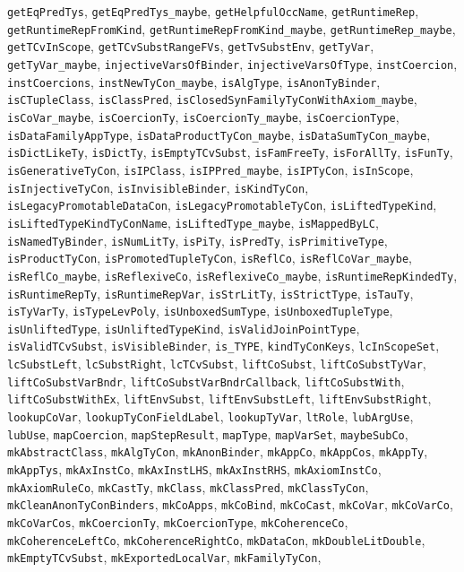 \texttt{getEqPredTys}, \texttt{getEqPredTys_maybe}, \texttt{getHelpfulOccName}, \texttt{getRuntimeRep}, \texttt{getRuntimeRepFromKind}, \texttt{getRuntimeRepFromKind_maybe}, \texttt{getRuntimeRep_maybe}, \texttt{getTCvInScope}, \texttt{getTCvSubstRangeFVs}, \texttt{getTvSubstEnv}, \texttt{getTyVar}, \texttt{getTyVar_maybe}, \texttt{injectiveVarsOfBinder}, \texttt{injectiveVarsOfType}, \texttt{instCoercion}, \texttt{instCoercions}, \texttt{instNewTyCon_maybe}, \texttt{isAlgType}, \texttt{isAnonTyBinder}, \texttt{isCTupleClass}, \texttt{isClassPred}, \texttt{isClosedSynFamilyTyConWithAxiom_maybe}, \texttt{isCoVar_maybe}, \texttt{isCoercionTy}, \texttt{isCoercionTy_maybe}, \texttt{isCoercionType}, \texttt{isDataFamilyAppType}, \texttt{isDataProductTyCon_maybe}, \texttt{isDataSumTyCon_maybe}, \texttt{isDictLikeTy}, \texttt{isDictTy}, \texttt{isEmptyTCvSubst}, \texttt{isFamFreeTy}, \texttt{isForAllTy}, \texttt{isFunTy}, \texttt{isGenerativeTyCon}, \texttt{isIPClass}, \texttt{isIPPred_maybe}, \texttt{isIPTyCon}, \texttt{isInScope}, \texttt{isInjectiveTyCon}, \texttt{isInvisibleBinder}, \texttt{isKindTyCon}, \texttt{isLegacyPromotableDataCon}, \texttt{isLegacyPromotableTyCon}, \texttt{isLiftedTypeKind}, \texttt{isLiftedTypeKindTyConName}, \texttt{isLiftedType_maybe}, \texttt{isMappedByLC}, \texttt{isNamedTyBinder}, \texttt{isNumLitTy}, \texttt{isPiTy}, \texttt{isPredTy}, \texttt{isPrimitiveType}, \texttt{isProductTyCon}, \texttt{isPromotedTupleTyCon}, \texttt{isReflCo}, \texttt{isReflCoVar_maybe}, \texttt{isReflCo_maybe}, \texttt{isReflexiveCo}, \texttt{isReflexiveCo_maybe}, \texttt{isRuntimeRepKindedTy}, \texttt{isRuntimeRepTy}, \texttt{isRuntimeRepVar}, \texttt{isStrLitTy}, \texttt{isStrictType}, \texttt{isTauTy}, \texttt{isTyVarTy}, \texttt{isTypeLevPoly}, \texttt{isUnboxedSumType}, \texttt{isUnboxedTupleType}, \texttt{isUnliftedType}, \texttt{isUnliftedTypeKind}, \texttt{isValidJoinPointType}, \texttt{isValidTCvSubst}, \texttt{isVisibleBinder}, \texttt{is_TYPE}, \texttt{kindTyConKeys}, \texttt{lcInScopeSet}, \texttt{lcSubstLeft}, \texttt{lcSubstRight}, \texttt{lcTCvSubst}, \texttt{liftCoSubst}, \texttt{liftCoSubstTyVar}, \texttt{liftCoSubstVarBndr}, \texttt{liftCoSubstVarBndrCallback}, \texttt{liftCoSubstWith}, \texttt{liftCoSubstWithEx}, \texttt{liftEnvSubst}, \texttt{liftEnvSubstLeft}, \texttt{liftEnvSubstRight}, \texttt{lookupCoVar}, \texttt{lookupTyConFieldLabel}, \texttt{lookupTyVar}, \texttt{ltRole}, \texttt{lubArgUse}, \texttt{lubUse}, \texttt{mapCoercion}, \texttt{mapStepResult}, \texttt{mapType}, \texttt{mapVarSet}, \texttt{maybeSubCo}, \texttt{mkAbstractClass}, \texttt{mkAlgTyCon}, \texttt{mkAnonBinder}, \texttt{mkAppCo}, \texttt{mkAppCos}, \texttt{mkAppTy}, \texttt{mkAppTys}, \texttt{mkAxInstCo}, \texttt{mkAxInstLHS}, \texttt{mkAxInstRHS}, \texttt{mkAxiomInstCo}, \texttt{mkAxiomRuleCo}, \texttt{mkCastTy}, \texttt{mkClass}, \texttt{mkClassPred}, \texttt{mkClassTyCon}, \texttt{mkCleanAnonTyConBinders}, \texttt{mkCoApps}, \texttt{mkCoBind}, \texttt{mkCoCast}, \texttt{mkCoVar}, \texttt{mkCoVarCo}, \texttt{mkCoVarCos}, \texttt{mkCoercionTy}, \texttt{mkCoercionType}, \texttt{mkCoherenceCo}, \texttt{mkCoherenceLeftCo}, \texttt{mkCoherenceRightCo}, \texttt{mkDataCon}, \texttt{mkDoubleLitDouble}, \texttt{mkEmptyTCvSubst}, \texttt{mkExportedLocalVar}, \texttt{mkFamilyTyCon}, 